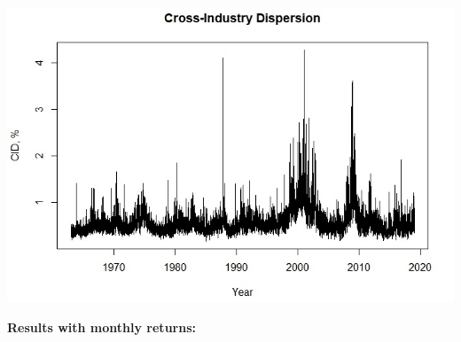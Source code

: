 \documentclass[16pt]{article}
\begin{document}



\includegraphics[width=1\textwidth]{ts_cid_00.jpeg}

\newpage

\textbf{Results with monthly returns:}
\end{document}
